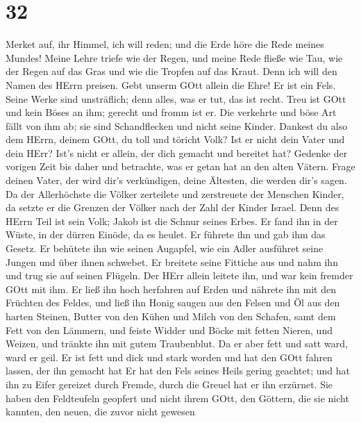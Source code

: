 \hypertarget{section-31}{%
\section{32}\label{section-31}}

 Merket auf, ihr Himmel, ich will reden; und die Erde höre
die Rede meines Mundes!  Meine Lehre triefe wie der Regen,
und meine Rede fließe wie Tau, wie der Regen auf das Gras und wie die
Tropfen auf das Kraut.  Denn ich will den Namen des HErrn
preisen. Gebt unserm GOtt allein die Ehre!  Er ist ein Fels.
Seine Werke sind unsträflich; denn alles, was er tut, das ist recht.
Treu ist GOtt und kein Böses an ihm; gerecht und fromm ist er.
 Die verkehrte und böse Art fällt von ihm ab; sie sind
Schandflecken und nicht seine Kinder.  Dankest du also dem
HErrn, deinem GOtt, du toll und töricht Volk? Ist er nicht dein Vater
und dein HErr? Ist's nicht er allein, der dich gemacht und bereitet hat?
 Gedenke der vorigen Zeit bis daher und betrachte, was er
getan hat an den alten Vätern. Frage deinen Vater, der wird dir's
verkündigen, deine Ältesten, die werden dir's sagen.  Da der
Allerhöchste die Völker zerteilete und zerstreuete der Menschen Kinder,
da setzte er die Grenzen der Völker nach der Zahl der Kinder Israel.
 Denn des HErrn Teil ist sein Volk; Jakob ist die Schnur
seines Erbes.  Er fand ihn in der Wüste, in der dürren
Einöde, da es heulet. Er führete ihn und gab ihm das Gesetz. Er behütete
ihn wie seinen Augapfel,  wie ein Adler ausführet seine
Jungen und über ihnen schwebet. Er breitete seine Fittiche aus und nahm
ihn und trug sie auf seinen Flügeln.  Der HErr allein
leitete ihn, und war kein fremder GOtt mit ihm.  Er ließ
ihn hoch herfahren auf Erden und nährete ihn mit den Früchten des
Feldes, und ließ ihn Honig saugen aus den Felsen und Öl aus den harten
Steinen,  Butter von den Kühen und Milch von den Schafen,
samt dem Fett von den Lämmern, und feiste Widder und Böcke mit fetten
Nieren, und Weizen, und tränkte ihn mit gutem Traubenblut. 
Da er aber fett und satt ward, ward er geil. Er ist fett und dick und
stark worden und hat den GOtt fahren lassen, der ihn gemacht hat Er hat
den Fels seines Heils gering geachtet;  und hat ihn zu
Eifer gereizet durch Fremde, durch die Greuel hat er ihn erzürnet.
 Sie haben den Feldteufeln geopfert und nicht ihrem GOtt,
den Göttern, die sie nicht kannten, den neuen, die zuvor nicht gewesen
